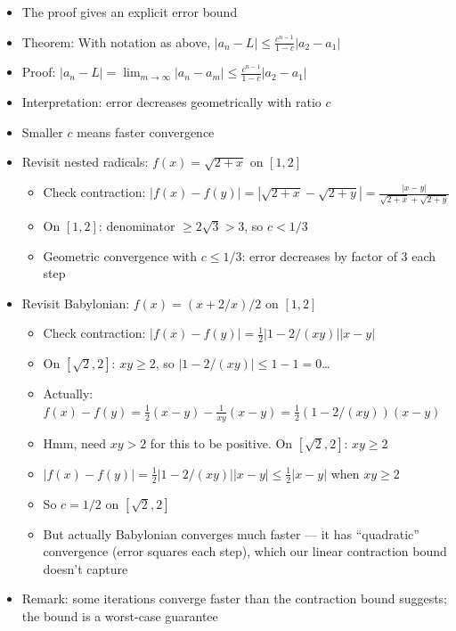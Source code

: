 \documentclass[
  10pt,
  letterpaper,
]{scrbook}
\providecommand{\tightlist}{%
  \setlength{\itemsep}{0pt}\setlength{\parskip}{0pt}}
\begin{document}
\begin{itemize}
\tightlist
\item
  The proof gives an explicit error bound
\item
  Theorem: With notation as above,
  \(|a_n - L| \leq \frac{c^{n-1}}{1-c}|a_2 - a_1|\)
\item
  Proof:
  \(|a_n - L| = \lim_{m \to \infty} |a_n - a_m| \leq \frac{c^{n-1}}{1-c}|a_2 - a_1|\)
\item
  Interpretation: error decreases geometrically with ratio \(c\)
\item
  Smaller \(c\) means faster convergence
\item
  Revisit nested radicals: \(f(x) = \sqrt{2 + x}\) on \([1, 2]\)

  \begin{itemize}
  \tightlist
  \item
    Check contraction:
    \(|f(x) - f(y)| = |\sqrt{2+x} - \sqrt{2+y}| = \frac{|x - y|}{\sqrt{2+x} + \sqrt{2+y}}\)
  \item
    On \([1, 2]\): denominator \(\geq 2\sqrt{3} > 3\), so \(c < 1/3\)
  \item
    Geometric convergence with \(c \leq 1/3\): error decreases by factor
    of 3 each step
  \end{itemize}
\item
  Revisit Babylonian: \(f(x) = (x + 2/x)/2\) on \([1, 2]\)

  \begin{itemize}
  \tightlist
  \item
    Check contraction:
    \(|f(x) - f(y)| = \frac{1}{2}|1 - 2/(xy)||x - y|\)
  \item
    On \([\sqrt{2}, 2]\): \(xy \geq 2\), so
    \(|1 - 2/(xy)| \leq 1 - 1 = 0\)\ldots{}
  \item
    Actually:
    \(f(x) - f(y) = \frac{1}{2}(x - y) - \frac{1}{xy}(x - y) = \frac{1}{2}(1 - 2/(xy))(x-y)\)
  \item
    Hmm, need \(xy > 2\) for this to be positive. On \([\sqrt{2}, 2]\):
    \(xy \geq 2\)
  \item
    \(|f(x) - f(y)| = \frac{1}{2}|1 - 2/(xy)||x - y| \leq \frac{1}{2}|x - y|\)
    when \(xy \geq 2\)
  \item
    So \(c = 1/2\) on \([\sqrt{2}, 2]\)
  \item
    But actually Babylonian converges much faster --- it has
    ``quadratic'' convergence (error squares each step), which our
    linear contraction bound doesn't capture
  \end{itemize}
\item
  Remark: some iterations converge faster than the contraction bound
  suggests; the bound is a worst-case guarantee
\end{itemize}
\end{document}
